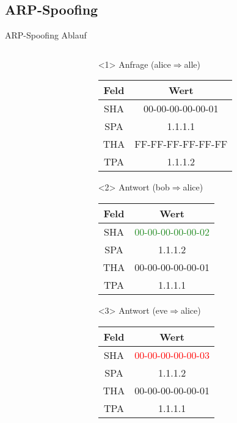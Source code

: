 \subsection{ARP-Spoofing}
\begin{frame}{ARP-Spoofing Ablauf}
	\begin{columns}
		\begin{column}{0.5\textwidth}
			\begin{center}
				
			\end{center}
		\end{column}
		\begin{column}{0.5\textwidth}
			\begin{center}
				\begin{onlyenv}<1>
					Anfrage (alice$\Rightarrow$alle)
					\begin{tabular}{|c|c|}
						\hline
						Feld & Wert \\
						\hline
						SHA & 00-00-00-00-00-01 \\
						\hline
						SPA & 1.1.1.1 \\
						\hline
						THA & FF-FF-FF-FF-FF-FF \\
						\hline
						TPA & 1.1.1.2 \\
						\hline
					\end{tabular}
				\end{onlyenv}
				\begin{onlyenv}<2>
					Antwort (bob$\Rightarrow$alice)
					\begin{tabular}{|c|c|}
						\hline
						Feld & Wert \\
						\hline
						SHA & \textcolor{ForestGreen}{00-00-00-00-00-02} \\
						\hline
						SPA & 1.1.1.2 \\
						\hline
						THA & 00-00-00-00-00-01 \\
						\hline
						TPA & 1.1.1.1 \\
						\hline
					\end{tabular}
				\end{onlyenv}
				\begin{onlyenv}<3>
					Antwort (eve$\Rightarrow$alice)
					\begin{tabular}{|c|c|}
						\hline
						Feld & Wert \\
						\hline
						SHA & \textcolor{red}{00-00-00-00-00-03} \\
						\hline
						SPA & 1.1.1.2 \\
						\hline
						THA & 00-00-00-00-00-01 \\
						\hline
						TPA & 1.1.1.1 \\
						\hline
					\end{tabular}
				\end{onlyenv}
				
			\end{center}
		\end{column}
	\end{columns}
\end{frame}

